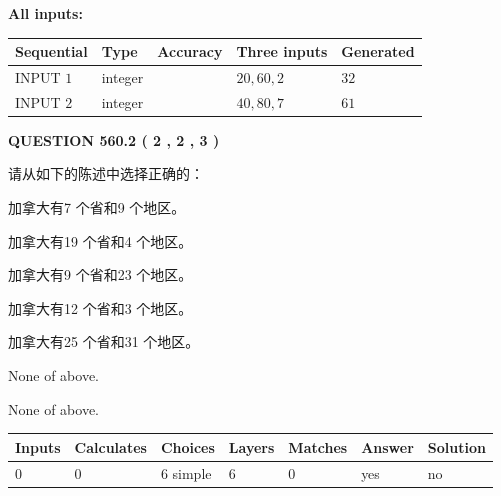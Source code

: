 \documentclass{ctexart}
\begin{document}
   
   
   
\noindent\vspace{0.1in}\hspace{-0.08in} {\textbf{\Large{All inputs: }}}
   
   
  
  
\noindent\begin{tabular}{|l|l|l|l|l|}
\hline
 Sequential & Type & Accuracy & Three inputs & Generated \\ 
\hline
 
 
  INPUT $  1 $ & integer &  & $
 20
 , 
 60
 , 
 2
 $ & $ 32 $ 
 \\  \hline  
 
 
  INPUT $  2 $ & integer &  & $
 40
 , 
 80
 , 
 7
 $ & $ 61 $ 
 \\  \hline  
 \end{tabular}
   
   
  
\vspace{0.2in}
  
{\textbf{\Large{QUESTION
560.2 
 ( 2 , 2 , 3 )
}}}
  
  
请从如下的陈述中选择正确的：
 
 
加拿大有7 个省和9 个地区。
 
 
加拿大有19 个省和4 个地区。
 
 
加拿大有9 个省和23 个地区。
 
 
加拿大有12 个省和3 个地区。
 
 
加拿大有25 个省和31 个地区。
 
 
 None of above.
 
 
\noindent{}
 
 
 None of above.
 
 
\noindent{}
 
 
   
   
   
   
\noindent\begin{tabular}{|l|l|l|l|l|l|l|}
 \hline
Inputs & Calculates & Choices & Layers & Matches & Answer & Solution \\ \hline
 0  & 
 0  & 
 6
  simple  
  & 
 6  & 
 0  & 
  yes & 
  no 
  \\ \hline
 \end{tabular}
   
\end{document}
